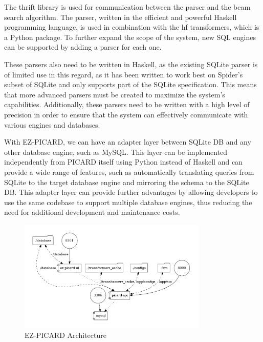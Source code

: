 
The thrift library is used for communication between the parser and the beam search algorithm. The parser, written in the efficient and powerful Haskell programming language, is used in combination with the hf transformers, which is a Python package. To further expand the scope of the system, new SQL engines can be supported by adding a parser for each one.

These parsers also need to be written in Haskell, as the existing SQLite parser is of limited use in this regard, as it has been written to work best on Spider's subset of SQLite and only supports part of the SQLite specification. This means that more advanced parsers must be created to maximize the system's capabilities. Additionally, these parsers need to be written with a high level of precision in order to ensure that the system can effectively communicate with various engines and databases.

With EZ-PICARD, we can have an adapter layer between SQLite DB and any other database engine, such as MySQL. This layer can be implemented independently from PICARD itself using Python instead of Haskell and can provide a wide range of features, such as automatically translating queries from SQLite to the target database engine and mirroring the schema to the SQLite DB. This adapter layer can provide further advantages by allowing developers to use the same codebase to support multiple database engines, thus reducing the need for additional development and maintenance costs.

\begin{figure}[h]
    \centering
    \includegraphics[width=0.8\textwidth]{pics/ez/map.png}
    \caption{EZ-PICARD Architecture}
\end{figure}
